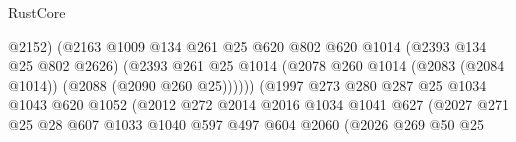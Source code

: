 \begin{lexlean}{RustCore}
\begin{coremodule}
                                            @2152)
                                          (@2163
                                            @1009
                                            @134
                                            @261
                                            @25
                                            @620
                                            @802
                                            @620
                                            @1014
                                            (@2393 @134 @25 @802 @2626)
                                            (@2393
                                              @261
                                              @25
                                              @1014
                                              (@2078
                                                @260
                                                @1014
                                                (@2083 (@2084 @1014))
                                                (@2088 (@2090 @260 @25))))))
                                        (@1997
                                          @273
                                          @280
                                          @287
                                          @25
                                          @1034
                                          @1043
                                          @620
                                          @1052
                                          (@2012
                                            @272
                                            @2014
                                            @2016
                                            @1034
                                            @1041
                                            @627
                                            (@2027
                                              @271
                                              @25
                                              @28
                                              @607
                                              @1033
                                              @1040
                                              @597
                                              @497
                                              @604
                                              @2060
                                              (@2026
                                                @269
                                                @50
                                                @25

\end{coremodule}
\end{lexlean}
